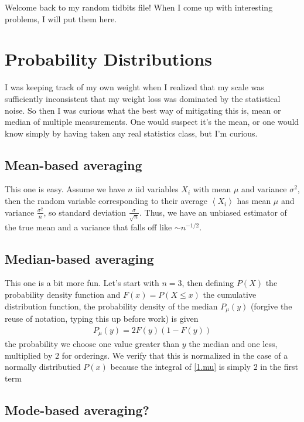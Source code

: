\documentclass[10pt]{article}
\newcommand{\expvalue}[1]{\left<#1\right>}
\begin{document}
\pagestyle{fancy}
\cfoot{\thepage/\pageref{LastPage}}

Welcome back to my random tidbits file! When I come up with interesting problems, I will put them here.

\section{Probability Distributions}

I was keeping track of my own weight when I realized that my scale was sufficiently inconsistent that my weight loss was dominated by the statistical noise. So then I was curious what the best way of mitigating this is, mean or median of multiple measurements. One would suspect it's the mean, or one would know simply by having taken any real statistics class, but I'm curious.

\subsection{Mean-based averaging}

This one is easy. Assume we have $n$ iid variables $X_i$ with mean $\mu$ and variance $\sigma^2$, then the random variable corresponding to their average $\expvalue{X_i}$ has mean $\mu$ and variance $\frac{\sigma^2}{n}$, so standard deviation $\frac{\sigma}{\sqrt{n}}$. Thus, we have an unbiased estimator of the true mean and a variance that falls off like $\sim n^{-1/2}$.


\subsection{Median-based averaging}

This one is a bit more fun. Let's start with $n=3$, then defining $P(X)$ the probability density function and $F(x) = P(X \leq x)$ the cumulative distribution function, the probability density of the median $P_\mu(y)$ (forgive the reuse of notation, typing this up before work) is given
\begin{align}
    P_\mu(y) = 2F(y)\left( 1 - F(y) \right)\label{1.mu}
\end{align}
the probability we choose one value greater than $y$ the median and one less, multiplied by $2$ for orderings. We verify that this is normalized in the case of a normally distributied $P(x)$ because the integral of \autoref{1.mu} is simply $2$ in the first term

\subsection{Mode-based averaging?}

\end{document}
